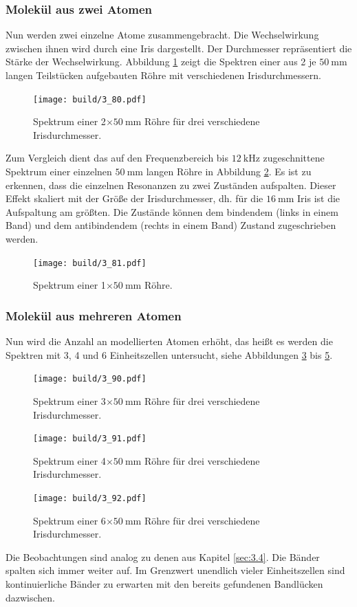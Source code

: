 \subsubsection{Molekül aus zwei Atomen}
Nun werden zwei einzelne Atome zusammengebracht. Die Wechselwirkung zwischen ihnen wird durch eine Iris dargestellt. Der Durchmesser repräsentiert die Stärke der Wechselwirkung. Abbildung \ref{fig:3_80} zeigt die Spektren einer aus 2 je $\SI{50}{\milli\meter}$ langen Teilstücken aufgebauten Röhre mit verschiedenen Irisdurchmessern.
\begin{figure}
  \centering  \texttt{[image: build/3\_80.pdf]}  \caption{Spektrum einer 2$\times\SI{50}{\milli\meter}$ Röhre für drei verschiedene Irisdurchmesser.} \label{fig:3_80}
\end{figure}
Zum Vergleich dient das auf den Frequenzbereich bis $\SI{12}{\kilo\hertz}$ zugeschnittene Spektrum einer einzelnen $\SI{50}{\milli\meter}$ langen Röhre in Abbildung \ref{fig:3_81}. Es ist zu erkennen, dass die einzelnen Resonanzen zu zwei Zuständen aufspalten. Dieser Effekt skaliert mit der Größe der Irisdurchmesser, dh. für die $\SI{16}{\milli\meter}$ Iris ist die Aufspaltung am größten. Die Zustände können dem bindendem (links in einem Band) und dem antibindendem (rechts in einem Band) Zustand zugeschrieben werden.
\begin{figure}
  \centering  \texttt{[image: build/3\_81.pdf]}  \caption{Spektrum einer 1$\times\SI{50}{\milli\meter}$ Röhre.} \label{fig:3_81}
\end{figure}
\subsubsection{Molekül aus mehreren Atomen}
Nun wird die Anzahl an modellierten Atomen erhöht, das heißt es werden die Spektren mit 3, 4 und 6 Einheitszellen untersucht, siehe Abbildungen \ref{fig:3_90} bis \ref{fig:3_92}.
\begin{figure}
  \centering  \texttt{[image: build/3\_90.pdf]}  \caption{Spektrum einer 3$\times\SI{50}{\milli\meter}$ Röhre für drei verschiedene Irisdurchmesser.} \label{fig:3_90}
\end{figure}
\begin{figure}
  \centering  \texttt{[image: build/3\_91.pdf]}  \caption{Spektrum einer 4$\times\SI{50}{\milli\meter}$ Röhre für drei verschiedene Irisdurchmesser.} \label{fig:3_91}
\end{figure}
\begin{figure}
  \centering  \texttt{[image: build/3\_92.pdf]}  \caption{Spektrum einer 6$\times\SI{50}{\milli\meter}$ Röhre für drei verschiedene Irisdurchmesser.} \label{fig:3_92}
\end{figure}
Die Beobachtungen sind analog zu denen aus Kapitel \ref{sec:3.4}. Die Bänder spalten sich immer weiter auf. Im Grenzwert unendlich vieler Einheitszellen sind kontinuierliche Bänder zu erwarten mit den bereits gefundenen Bandlücken dazwischen.

